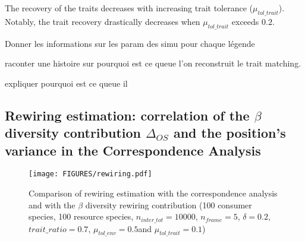 The recovery of the traits decreases with increasing trait tolerance ($\mu_{tol\_trait}$). Notably, the trait recovery drastically decreases when $\mu_{tol\_trait}$ exceeds  $0.2$.















Donner les informations sur les param des simu pour chaque légende

raconter une histoire sur pourquoi est ce queue l'on reconstruit le trait matching.

expliquer pourquoi est ce queue il 



\subsection{Rewiring estimation: correlation of the $\beta$ diversity contribution $\Delta_{OS}$ and the position's variance in the Correspondence Analysis}

\begin{figure}[H]
    \centering
    \texttt{[image: FIGURES/rewiring.pdf]}
    \caption{Comparison of rewiring estimation with the correspondence analysis and with the $\beta$ diversity rewiring contribution (100 consumer species, 100 resource species, $n_{inter\_tot} = 10000$, $n_{frame} = 5$, $\delta =  0.2$, $trait\_ratio = 0.7$, $\mu_{tol\_env} = 0.5$and $\mu_{tol\_trait} = 0.1$)}
    \label{fig:toju}
\end{figure}

